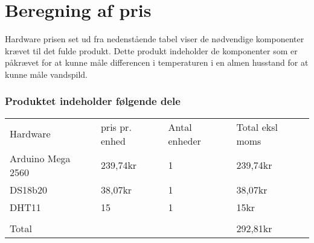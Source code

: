 \section{Beregning af pris}
Hardware prisen set ud fra nedenstående tabel viser de nødvendige komponenter krævet til det fulde produkt. Dette produkt indeholder de komponenter som er påkrævet for at kunne måle differencen i temperaturen i en almen husstand for at kunne måle vandspild.
\subsubsection{Produktet indeholder følgende dele}  



\begin{tabular}{ |p{3cm}||p{3cm}|p{3cm}|p{3cm}|  }
 \hline
 \rowcolor{lightgray}\multicolumn{4}{|c|}{Pris beregning} \\
 \hline
 Hardware    & pris pr. enhed &Antal enheder&Total eksl moms\\
 \hline
 Arduino Mega 2560   & 239,74kr    &1&   239,74kr\\
 \hline
 DS18b20&   38,07kr  & 1   &38,07kr\\
 \hline
 DHT11 &15 & 1&  15kr\\
 \hline
 		&	&	&\\
 \hline
 Total	&	&	&292,81kr\\
 \hline 
\end{tabular}


